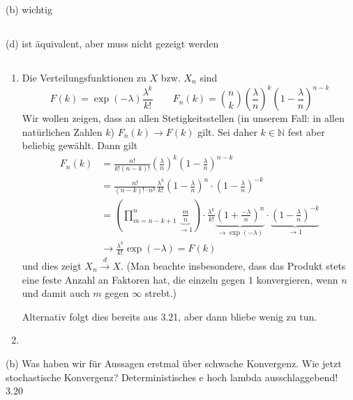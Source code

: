 \documentclass[a4paper]{article}
\begin{document}
(b) wichtig

\subsection{}

(d) ist äquivalent, aber muss nicht gezeigt werden

\subsection{}


\begin{enumerate}
    \item Die Verteilungsfunktionen zu $X$ bzw. $X_n$ sind
    \begin{equation*}
        F(k) = \exp(- \lambda) \frac{\lambda^k}{k!} \qquad F_n(k) = \binom{n}{k} \left(\frac{\lambda}{n}\right)^{k} \left(1 - \frac{\lambda}{n}\right)^{n-k} 
    \end{equation*}
    Wir wollen zeigen, dass an allen Stetigkeitsstellen (in unserem Fall: in allen natürlichen Zahlen $k$) $F_n(k) \to F(k)$ gilt. Sei daher $k \in \mathds{N}$ fest aber beliebig gewählt. Dann gilt
    \begin{align*}
        F_n(k) &= \frac{n!}{k!(n-k)!}  \left(\frac{\lambda}{n}\right)^{k} \left(1 - \frac{\lambda}{n}\right)^{n-k} \\
        &= \frac{n!}{(n-k)! \cdot n^k}  \frac{\lambda^k}{k!} \left(1 - \frac{\lambda}{n}\right)^n \cdot \left(1 - \frac{\lambda}{n}\right)^{-k}\\
        &= \left(\prod_{m=n-k+1}^{n} \underbrace{\frac{m}{n}}_{\to 1}\right) \cdot \frac{\lambda^k}{k!} \underbrace{\left(1 + \frac{-\lambda}{n}\right)^n}_{\to \exp(-\lambda)} \cdot \underbrace{\left(1 - \frac{\lambda}{n}\right)^{-k}}_{\to 1}\\
        &\to \frac{\lambda^k}{k!} \exp(-\lambda) = F(k)
    \end{align*}
    und dies zeigt $X_n \xrightarrow{d} X$. (Man beachte insbesondere, dass das Produkt stets eine feste Anzahl an Faktoren hat, die einzeln gegen $1$ konvergieren, wenn $n$ und damit auch $m$ gegen $\infty$ strebt.)

    Alternativ folgt dies bereits aus 3.21, aber dann bliebe wenig zu tun.
    \item 
\end{enumerate}

(b) Was haben wir für Aussagen erstmal über schwache Konvergenz. Wie jetzt stochastische Konvergenz? Deterministisches e hoch lambda ausschlaggebend! 3.20
\end{document}
